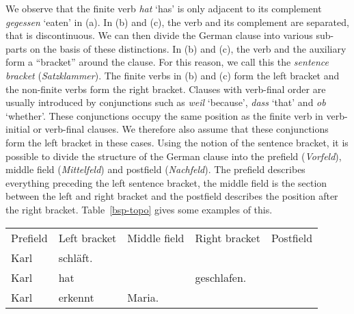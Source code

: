 {We observe that the finite verb \emph{hat} `has' is only adjacent to its complement
\emph{gegessen} `eaten' in (a). In (b) and (c), the verb and its complement
are separated, that is discontinuous. We can then divide the German clause into various sub-parts on the basis of these distinctions.
In (b) and (c), the verb and the auxiliary form a ``bracket'' around the clause. For this reason, we call this the \emph{sentence bracket} (\emph{Satzklammer}).
The finite verbs in (b) and (c) form the left bracket and the non-finite verbs form the right bracket. Clauses with verb-final order are usually introduced by conjunctions such as 
\emph{weil} `because', \emph{dass} `that' and \emph{ob} `whether'. These conjunctions occupy the same position as the finite verb in verb-initial or verb-final clauses. We therefore
also assume that these conjunctions form the left bracket in these cases. Using the notion of the sentence bracket, it is possible to divide the structure of the German clause into the 
prefield (\emph{Vorfeld}), middle field (\emph{Mittelfeld}) and postfield (\emph{Nachfeld}). The
prefield describes everything preceding the left sentence bracket, the middle field is the section
between the left and right bracket and the postfield describes the position after the right bracket.
Table~\vref{bsp-topo} gives some examples of this.
%
{}%
%
%
%
%
%
\begin{table}
\begin{sideways}
\begin{tabular}{lllll}
Prefield & Left bracket & Middle field                           & Right bracket & Postfield                   \\\lsptoprule
Karl    & schläft.                                                                                            \\
Karl    & hat           &                                        & geschlafen.                                 \\
Karl    & erkennt       & Maria.                                                                               \\

\end{tabular}
\end{sideways}
\end{table}}
